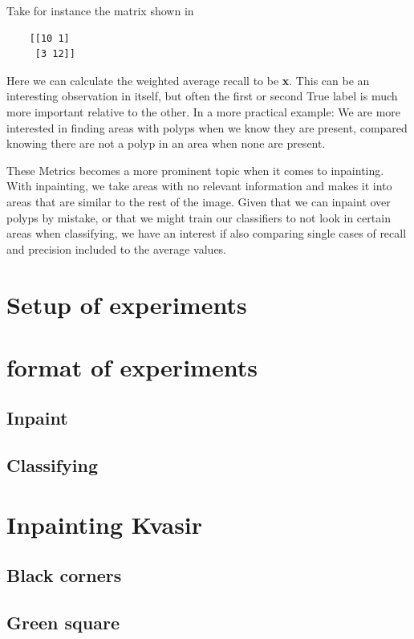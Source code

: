Take for instance the matrix shown in \\
\begin{verbatim}
    [[10 1]
     [3 12]]
\end{verbatim}

 Here we can calculate the weighted average recall to be \textbf{x}. This can be an interesting observation in itself, but often the first or second True label is much more important relative to the other.  In a more practical example: We are more interested in finding areas with polyps when we know they are present, compared knowing there are not a polyp in an area when none are present. 

These Metrics becomes a more prominent topic when it comes to inpainting. With inpainting, we take areas with no relevant information and makes it into areas that are similar to the rest of the image. Given that we can inpaint over polyps by mistake, or that we might train our classifiers to not look in certain areas when classifying, we have an interest if also comparing single cases of recall and precision included to the average values.

    \section{Setup of experiments}



\section{format of experiments}
    \subsection{Inpaint}
    \subsection{Classifying}
    
\section{Inpainting Kvasir}
    \subsection{Black corners}
    \subsection{Green square}

